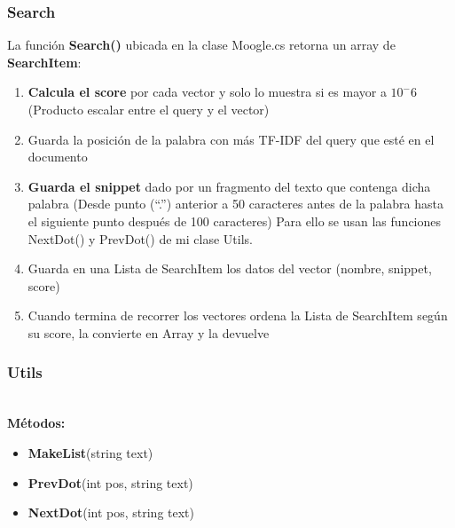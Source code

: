 \documentclass{beamer}
\begin{document}
    \begin{frame}
        \frametitle{Search}
        La función \textbf{Search()} ubicada en la clase Moogle.cs retorna un array de \textbf{SearchItem}:
    
        \begin{enumerate}
            \item \textbf{Calcula el score} por cada vector y solo lo muestra si es mayor a $10^-6$ (Producto 
            escalar entre el query y el vector)
            \item Guarda la posición de la palabra con más TF-IDF del query que esté en el documento
            \item \textbf{Guarda el snippet} dado por un fragmento del texto que contenga dicha palabra
            (Desde punto (“.”) anterior a 50 caracteres antes de la palabra hasta el 
            siguiente punto después de 100 caracteres)
            Para ello se usan las funciones NextDot() y PrevDot() de mi clase Utils.
            \item Guarda en una Lista de SearchItem los datos del vector (nombre, snippet, score)
            \item Cuando termina de recorrer los vectores ordena la Lista de SearchItem según su score, 
            la convierte en Array y la devuelve    
        \end{enumerate}
    \end{frame}
    \begin{frame}
        \frametitle{Utils}
        \textbf{\\\large{Métodos:}}
        \begin{itemize}
            \item  \textbf{MakeList}(string text)
            \item \textbf{PrevDot}(int pos, string text)
            \item \textbf{NextDot}(int pos, string text)
        \end{itemize}
    \end{frame}
    
\end{document}
